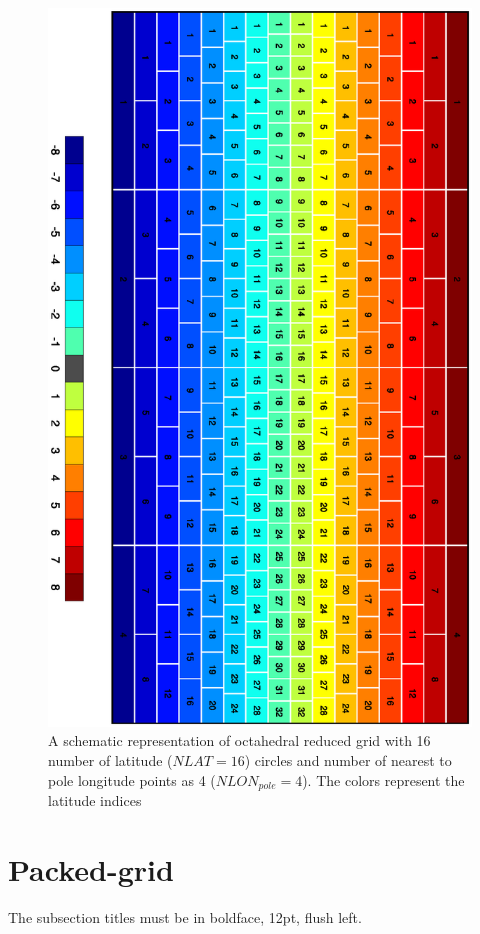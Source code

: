 \documentclass{SBCbookchapter}
\begin{document}
\begin{figure}[H]
	\includegraphics[angle=90,width=\linewidth]{grid2}
	\caption{A schematic representation of octahedral reduced grid with 16 number of latitude ($NLAT=16$) circles and number of nearest to pole longitude points as 4 ($NLON_{pole}=4$). The colors represent the latitude indices }
	\label{figone}
\end{figure}

\section{Packed-grid}
The subsection titles must be in boldface, 12pt, flush left.
\end{document}
